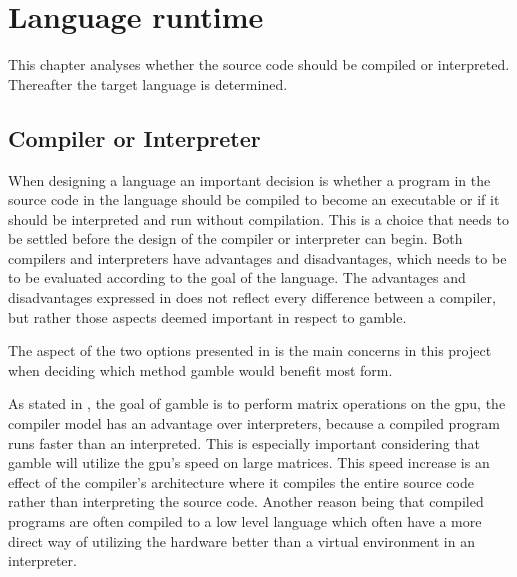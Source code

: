 \chapter{Language runtime}
This chapter analyses whether the source code should be compiled or interpreted.
Thereafter the target language is determined.

\section{Compiler or Interpreter}
When designing a language an important decision is whether a program in the source code in the language should be compiled to become an executable or if it should be interpreted and run without compilation.
This is a choice that needs to be settled before the design of the compiler or interpreter can begin.
Both compilers and interpreters have advantages and disadvantages, which needs to be to be evaluated according to the goal of the language.
The advantages and disadvantages expressed in  does not reflect every difference between a compiler, but rather those aspects deemed important in respect to \gls{gamble}.



The aspect of the two options presented in  is the main concerns in this project when deciding which method \gls{gamble} would benefit most form.

As stated in , the goal of \gls{gamble} is to perform matrix operations on the \acrshort{gpu}, the compiler model has an advantage over interpreters, because a compiled program runs faster than an interpreted. 
This is especially important considering that \gls{gamble} will utilize the \acrshort{gpu}'s speed on large matrices. 
This speed increase is an effect of the compiler's architecture where it compiles the entire source code rather than interpreting  the source code. 
Another reason being that compiled programs are often compiled to a low level language which often have a more direct way of utilizing the hardware better than a virtual environment in an interpreter.

